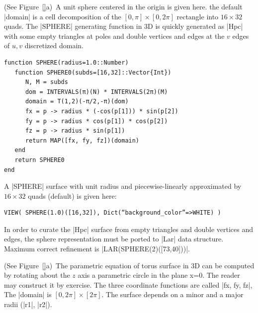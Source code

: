 \begin{coding}[Algebraic computation of FE = $\delta_1$]
\begin{condition} (See Figure~\ref{}a)\
A unit sphere centered in the origin is given here. the default |domain| is a cell  decomposition of the $[0,\pi] \times [0,2\pi]$ rectangle into $16\times 32$ quads.
The |SPHERE| generating function in 3D is quickly generated as |Hpc| with some empty triangles at poles and double vertices and edges at the $v$ edges of $u,v$ discretized domain. 
\begin{lstlisting}[language=JuliaLocal, style=julia, mathescape=true]
function SPHERE(radius=1.0::Number)
   function SPHERE0(subds=[16,32]::Vector{Int})
      N, M = subds
      dom = INTERVALS(π)(N) * INTERVALS(2π)(M)
      domain = T(1,2)(-π/2,-π)(dom)
      fx = p -> radius * (-cos(p[1])) * sin(p[2])
      fy = p -> radius * cos(p[1]) * cos(p[2])
      fz = p -> radius * sin(p[1])
      return MAP([fx, fy, fz])(domain)
   end
   return SPHERE0
end
\end{lstlisting}
A |SPHERE| surface with unit radius and piecewise-linearly approximated by  $16\times 32$ quads (default) is given here:
\begin{lstlisting}[language=JuliaLocal, style=julia, mathescape=true]
VIEW( SPHERE(1.0)([16,32]), Dict(“background_color”=>WHITE) )
\end{lstlisting}
In order to curate the |Hpc| surface from empty triangles and double vertices and edges,
the sphere representation must be ported to |Lar| data structure.
Maximum correct refinement is |LAR(SPHERE(2)([73,40]))|.
\end{condition}

\begin{condition}[(Parametric torus] (See Figure~\ref{}a)\
The parametric equation of torus surface in 3D can be computed by rotating about the $z$ axis a parametric circle in the plane x=0. The reader may construct it by exercise. The three coordinate functions are called |fx, fy, fz|, The |domain| is $[0,2\pi]\times[2\pi]$. The surface depends on a minor and a major radii (|r1|, |r2|).


\end{condition}
\end{coding}
